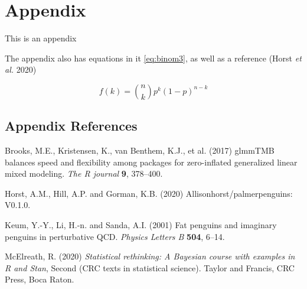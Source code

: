 \documentclass[
]{article}
\newlength{\cslhangindent}
\newenvironment{cslreferences}%
  {\setlength{\parindent}{0pt}%
  \everypar{\setlength{\hangindent}{\cslhangindent}}\ignorespaces}%
  {\par}
\begin{document}
\newpage

\hypertarget{appendix}{%
\section{Appendix}\label{appendix}}

\renewcommand{\thefigure}{A\arabic{figure}}

\setcounter{figure}{0}

\renewcommand{\thetable}{A\arabic{table}}

\setcounter{table}{0}

\renewcommand{\theequation}{A\arabic{equation}}

\setcounter{equation}{0}

This is an appendix

The appendix also has equations in it \eqref{eq:binom3}, as well as a reference (Horst \emph{et al.} 2020)

\begin{equation} 
  f\left(k\right) = \binom{n}{k} p^k\left(1-p\right)^{n-k}
  \label{eq:binom3}
\end{equation}

\hypertarget{appendix-references}{%
\subsection{Appendix References}\label{appendix-references}}

\hypertarget{refs}{}
\begin{cslreferences}
\leavevmode\hypertarget{ref-brooks2017}{}%
Brooks, M.E., Kristensen, K., van Benthem, K.J., et al. (2017) glmmTMB balances speed and flexibility among packages for zero-inflated generalized linear mixed modeling. \emph{The R journal} \textbf{9}, 378--400.

\leavevmode\hypertarget{ref-horst2020}{}%
Horst, A.M., Hill, A.P. and Gorman, K.B. (2020) Allisonhorst/palmerpenguins: V0.1.0.

\leavevmode\hypertarget{ref-keum2001}{}%
Keum, Y.-Y., Li, H.-n. and Sanda, A.I. (2001) Fat penguins and imaginary penguins in perturbative QCD. \emph{Physics Letters B} \textbf{504}, 6--14.

\leavevmode\hypertarget{ref-mcelreath2020}{}%
McElreath, R. (2020) \emph{Statistical rethinking: A Bayesian course with examples in R and Stan}, Second (CRC texts in statistical science). Taylor and Francis, CRC Press, Boca Raton.
\end{cslreferences}
\end{document}
